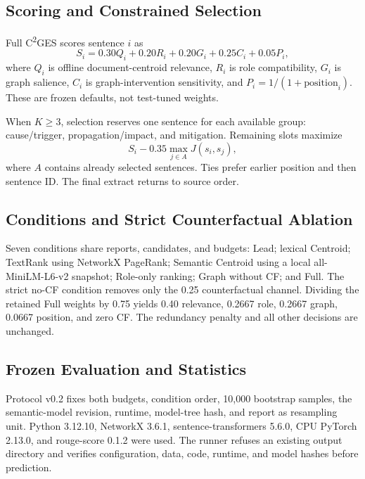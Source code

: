 \documentclass[applsci,article,submit,moreauthors]{Definitions/mdpi}
\newcommand{\cges}{C\textsuperscript{2}GES}
\begin{document}
\subsection{Scoring and Constrained Selection}

Full \cges{} scores sentence $i$ as
\begin{equation}
S_i=0.30Q_i+0.20R_i+0.20G_i+0.25C_i+0.05P_i,
\end{equation}
where $Q_i$ is offline document-centroid relevance, $R_i$ is role compatibility, $G_i$ is graph salience, $C_i$ is graph-intervention sensitivity, and $P_i=1/(1+\mathrm{position}_i)$. These are frozen defaults, not test-tuned weights.

When $K\geq3$, selection reserves one sentence for each available group: cause/trigger, propagation/impact, and mitigation. Remaining slots maximize
\begin{equation}
S_i-0.35\max_{j\in A}J(s_i,s_j),
\end{equation}
where $A$ contains already selected sentences. Ties prefer earlier position and then sentence ID. The final extract returns to source order.

\subsection{Conditions and Strict Counterfactual Ablation}

Seven conditions share reports, candidates, and budgets: Lead; lexical Centroid; TextRank using NetworkX PageRank; Semantic Centroid using a local all-MiniLM-L6-v2 snapshot; Role-only ranking; Graph without CF; and Full. The strict no-CF condition removes only the 0.25 counterfactual channel. Dividing the retained Full weights by 0.75 yields 0.40 relevance, 0.2667 role, 0.2667 graph, 0.0667 position, and zero CF. The redundancy penalty and all other decisions are unchanged.

\subsection{Frozen Evaluation and Statistics}

Protocol v0.2 fixes both budgets, condition order, 10,000 bootstrap samples, the semantic-model revision, runtime, model-tree hash, and report as resampling unit. Python 3.12.10, NetworkX 3.6.1, sentence-transformers 5.6.0, CPU PyTorch 2.13.0, and rouge-score 0.1.2 were used. The runner refuses an existing output directory and verifies configuration, data, code, runtime, and model hashes before prediction.
\end{document}
